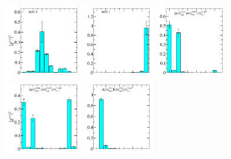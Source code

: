 \begin{figure}
  \includegraphics[width=0.304\textwidth]{figures/spectrum_a1gm/no_tq/zfactors/zfactor_isotriplet-S0-P000-A1gm_1-ROT-0.pdf}
  \includegraphics[width=0.28\textwidth]{figures/spectrum_a1gm/no_tq/zfactors/zfactor_isotriplet-S0-P000-A1gm_1-ROT-1.pdf}
  \includegraphics[width=0.28\textwidth]{figures/spectrum_a1gm/no_tq/zfactors/zfactor_isotriplet_phi_pion-A1gm_1-P000-A1up-SS_0-P000-A1um-SS_0.pdf}\\
  \includegraphics[width=0.304\textwidth]{figures/spectrum_a1gm/no_tq/zfactors/zfactor_isotriplet_eta_pion-A1gm_1-P000-A1up-SS_0-P000-A1um-SS_0.pdf}
  \includegraphics[width=0.28\textwidth]{figures/spectrum_a1gm/no_tq/zfactors/zfactor_isotriplet_kaon_kbar-A1gm_1-P000-A1u-SS_0-P000-A1u-SS_0.pdf}

\end{figure}
